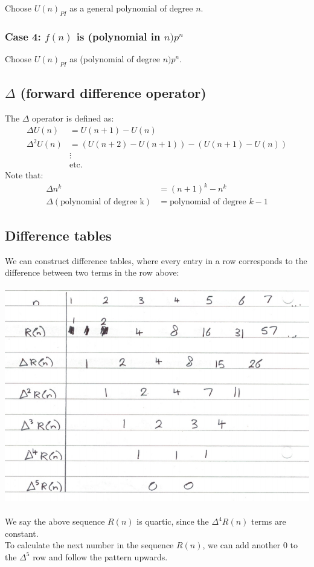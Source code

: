\documentclass{scrartcl}
\begin{document}
Choose $ U(n)_{PI} $ as a general polynomial of degree $ n $.

\subsubsection*{Case 4: $ f(n) $ is (polynomial in $ n )p^{n}$}

Choose $ U(n)_{PI} $ as (polynomial of degree $ n)p^{n} $.

\subsection*{$ \Delta $ (forward difference operator)}

The $ \Delta $ operator is defined as:
\begin{align}
\Delta U(n) & = U(n+1) - U(n) \\
\Delta^{2} U(n) & = (U(n+2) - U(n+1)) - (U(n+1) - U(n)) \\
& \vdots \\ 
& \textrm{etc.}
\end{align}
Note that:
\begin{align}
\Delta n^{k} & = (n+1)^{k} - n^{k} \\
\Delta (\textrm{polynomial of degree k}) & = \textrm{polynomial of degree } k - 1
\end{align}

\subsection{Difference tables}

We can construct difference tables, where every entry in a row corresponds to the difference between two terms in the row above:
\\\\
\includegraphics[scale=0.5]{differencetable}
\\\\
We say the above sequence $ R(n) $ is quartic, since the $ \Delta^{4}R(n) $ terms are constant.
\\
To calculate the next number in the sequence $ R(n) $, we can add another $ 0 $ to the $ \Delta^{5} $ row and follow the pattern upwards.
\end{document}
